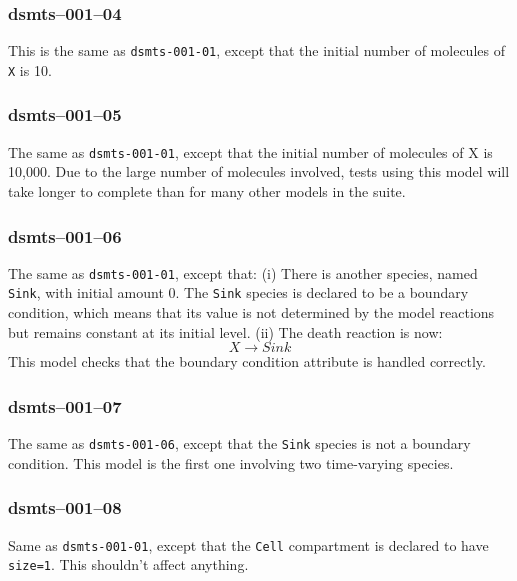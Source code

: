 
\subsubsection{dsmts--001--04}

This is the same as \verb$dsmts-001-01$, except that the initial
number of molecules of \verb$X$ is 10.


\subsubsection{dsmts--001--05}

The same as \verb$dsmts-001-01$, except that the initial number of
molecules of X is 10,000. Due to the large number of molecules
involved, tests using this model will take longer to complete than for
many other models in the suite.


\subsubsection{dsmts--001--06}

The same as \verb$dsmts-001-01$, except that: (i) There is another
species, named \texttt{Sink}, with initial amount 0. The \verb$Sink$
species is declared to be a boundary condition, which means that its
value is not determined by the model reactions but remains constant at
its initial level. (ii) The death reaction is now:
\[
X \longrightarrow Sink 
\]
This model checks that the boundary condition attribute is
handled correctly.


\subsubsection{dsmts--001--07}

The same as \verb$dsmts-001-06$, except that the \texttt{Sink} species
is not a boundary condition. This model is the first one involving two
time-varying species.


\subsubsection{dsmts--001--08}

Same as \verb$dsmts-001-01$, except that the \verb$Cell$ compartment
is declared to have \verb$size=1$. This shouldn't affect
anything.


